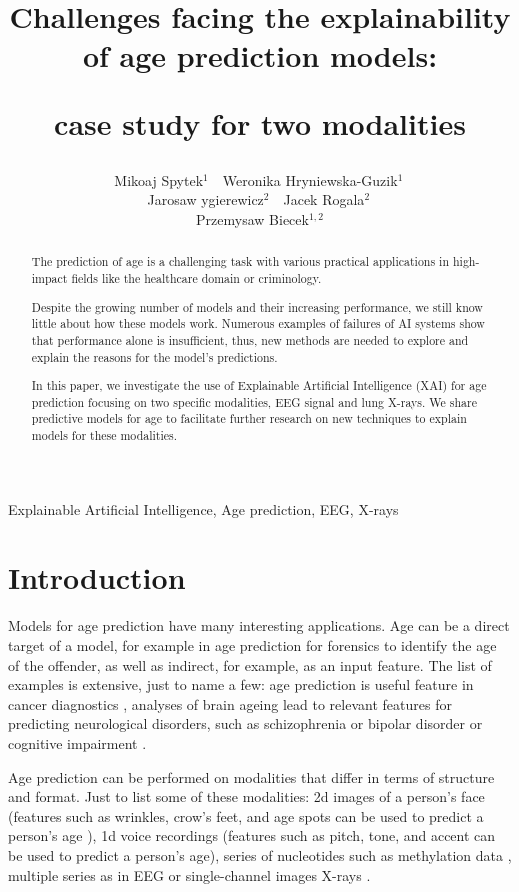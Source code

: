 \documentclass[letterpaper]{article} %
\title{Challenges facing the explainability of age prediction models: 

case study for two modalities}
\author{
       Mikoaj Spytek${}^1$\,\,\,\, Weronika Hryniewska-Guzik${}^1$\, \\ Jarosaw ygierewicz${}^2$\,\,\,\, Jacek Rogala${}^2$\, \\  Przemysaw Biecek${}^{1,2}$
}
\begin{document}
\maketitle

\begin{abstract}
The prediction of age is a challenging task with various practical applications in high-impact fields like the healthcare domain or criminology. 

Despite the growing number of models and their increasing performance, we still know little about how these models work. 
Numerous examples of failures of AI systems show that performance alone is insufficient, thus, new methods are needed to explore and explain the reasons for the model's predictions.

In this paper, we investigate the use of Explainable Artificial Intelligence (XAI) for age prediction focusing on two specific modalities, EEG signal and lung X-rays. We share predictive models for age to facilitate further research on new techniques to explain models for these modalities.

\end{abstract}

\begin{keywords}
  Explainable Artificial Intelligence, Age prediction, EEG, X-rays 
\end{keywords}

\section{Introduction}

Models for age prediction have many interesting applications. Age can be a direct target of a model, for example in age prediction for forensics to identify the age of the offender, as well as indirect, for example, as an input feature. The list of examples is extensive, just to name a few: age prediction is useful feature in cancer diagnostics \cite{cancer21}, analyses of brain ageing lead to relevant features for predicting neurological disorders, such as schizophrenia or bipolar disorder \cite{BrainAGE17} or cognitive impairment \cite{NeuroImage17}.

Age prediction can be performed on modalities that differ in terms of structure and format. Just to list some of these modalities: 2d images of a person's face (features such as wrinkles, crow's feet, and age spots can be used to predict a person's age \cite{CVPRWage15}), 1d voice recordings (features such as pitch, tone, and accent can be used to predict a person's age), series of nucleotides such as methylation data \cite{methylclock20}, multiple series as in EEG \cite{EEGage19, ColeBrain17} or single-channel images X-rays \cite{Thodberg2017}. 
\end{document}
